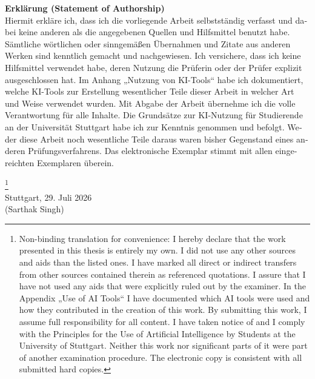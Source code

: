 \documentclass[12pt,leqno,a4paper]{article}
\begin{document}
\begin{otherlanguage}{german}
\noindent\textbf{Erklärung (Statement of Authorship)}\\


\noindent Hiermit erkläre ich, dass ich die vorliegende Arbeit selbstständig verfasst und dabei keine anderen als die angegebenen Quellen und Hilfsmittel benutzt habe. Sämtliche wörtlichen oder sinngemäßen Übernahmen und Zitate aus anderen Werken sind kenntlich gemacht und nachgewiesen. Ich versichere, dass ich keine Hilfsmittel verwendet habe, deren Nutzung die Prüferin oder der Prüfer explizit ausgeschlossen hat. Im Anhang „Nutzung von KI-Tools“ habe ich dokumentiert, welche KI-Tools zur Erstellung wesentlicher Teile dieser Arbeit in welcher Art und Weise verwendet wurden. Mit Abgabe der Arbeit übernehme ich die volle Verantwortung für alle Inhalte. Die Grundsätze zur KI-Nutzung für Studierende an der Universität Stuttgart habe ich zur Kenntnis genommen und befolgt. Weder diese Arbeit noch wesentliche Teile daraus waren bisher Gegenstand eines anderen Prüfungsverfahrens. Das elektronische Exemplar stimmt mit allen eingereichten Exemplaren überein.
\end{otherlanguage}
\footnote{Non-binding translation for convenience: I hereby declare that the work presented in this thesis is entirely my own. I did not use any other sources and aids than the listed ones. I have marked all direct or indirect transfers from other sources contained therein as referenced quotations. I assure that I have not used any aids that were explicitly ruled out by the examiner. In the Appendix „Use of AI Tools“ I have documented which AI tools were used and how they contributed in the creation of this work. By submitting this work, I assume full responsibility for all content. I have taken notice of and I comply with the Principles for the Use of Artificial Intelligence by Students at the University of Stuttgart. Neither this work nor significant parts of it were part of another examination procedure. The electronic copy is consistent with all submitted hard copies.}\\[2cm]


\noindent Stuttgart, 29. Juli 2026\\[1.5cm]
\noindent (Sarthak Singh)
\end{document}
